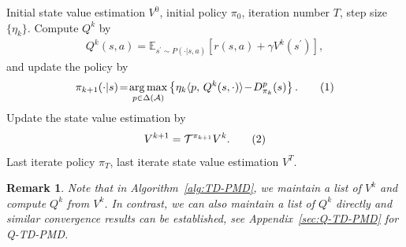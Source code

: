 \documentclass[10pt]{article}
\newcommand{\calA}{\mathcal{A}}
\newcommand{\calT}{\mathcal{T}}
\newcommand{\ls}{\left}
\newcommand{\rs}{\right}
\newcommand\numberthis{\addtocounter{equation}{1}\tag{\theequation}}
\theoremstyle{plain}
\newtheorem{remark}{Remark}[section]
\theoremstyle{definition}
\begin{document}
\begin{algorithm}[tb]
   \caption{TD-PMD}
   \label{alg:TD-PMD}
\begin{algorithmic}
    Initial state value estimation $V^0$, initial policy $\pi_0$, iteration number $T$, step size $\{ \eta_k \}$.
   \vspace{0.2cm}
   Compute $Q^k$ by 
   \begin{align*}
    Q^k\left( s,a \right) = \mathbb{E} _{s^{\prime}\sim P\left( \cdot |s,a \right)}\left[ r\left( s,a \right) +\gamma V^k\left( s^{\prime} \right) \right],
   \end{align*}
   and update the policy by
   \begin{align*}
       \pi_{k+1}(\cdot|s) \!=\! \underset{p\in\Delta(\calA)}{\arg\max} \ls\{ \eta_k \langle p, \, Q^{k}(s,\cdot) \rangle \!-\! D^p_{\pi_k}(s) \rs\}.\numberthis\label{eq:alg1pi}
   \end{align*}
    Update the state value estimation by
   \begin{align*}
       V^{k+1} = \calT^{\pi_{k+1}} V^k.\numberthis\label{eq:alg1v}
   \end{align*}
   \ENDFOR
    Last iterate policy $\pi_T$, last iterate state value estimation $V^T$.
\end{algorithmic}
\end{algorithm}


\begin{remark}
{Note that in Algorithm~\ref{alg:TD-PMD}, we maintain a list of $V^k$ and compute $Q^k$ from $V^k$. In contrast, we can also maintain a list of $Q^k$ directly and similar convergence results can be established, see Appendix~\ref{sec:Q-TD-PMD} for   Q-TD-PMD.}
\end{remark}
\end{document}
